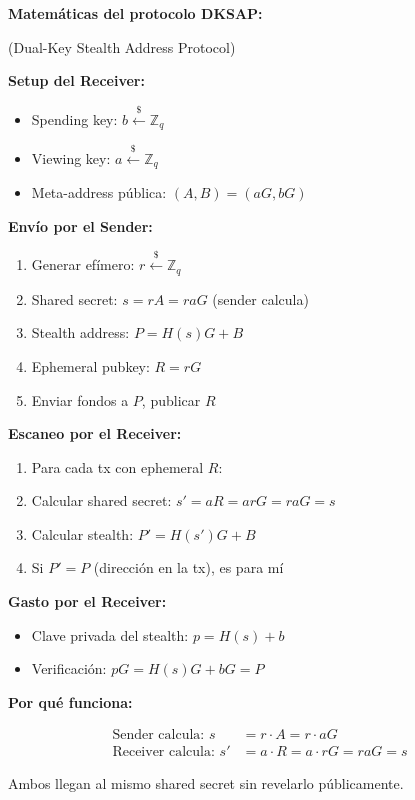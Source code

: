 \documentclass[11pt,a4paper,twoside]{book}
\begin{document}
\begin{mathnote}
\textbf{Matem\'aticas del protocolo DKSAP:}

(Dual-Key Stealth Address Protocol)

\textbf{Setup del Receiver:}
\begin{itemize}
    \item Spending key: $b \xleftarrow{\$} \mathbb{Z}_q$
    \item Viewing key: $a \xleftarrow{\$} \mathbb{Z}_q$
    \item Meta-address p\'ublica: $(A, B) = (aG, bG)$
\end{itemize}

\textbf{Env\'io por el Sender:}
\begin{enumerate}
    \item Generar ef\'imero: $r \xleftarrow{\$} \mathbb{Z}_q$
    \item Shared secret: $s = rA = raG$ (sender calcula)
    \item Stealth address: $P = H(s)G + B$
    \item Ephemeral pubkey: $R = rG$
    \item Enviar fondos a $P$, publicar $R$
\end{enumerate}

\textbf{Escaneo por el Receiver:}
\begin{enumerate}
    \item Para cada tx con ephemeral $R$:
    \item Calcular shared secret: $s' = aR = arG = raG = s$
    \item Calcular stealth: $P' = H(s')G + B$
    \item Si $P' = P$ (direcci\'on en la tx), es para m\'i
\end{enumerate}

\textbf{Gasto por el Receiver:}
\begin{itemize}
    \item Clave privada del stealth: $p = H(s) + b$
    \item Verificaci\'on: $pG = H(s)G + bG = P$ \checkmark
\end{itemize}

\textbf{Por qu\'e funciona:}

\begin{align*}
\text{Sender calcula: } s &= r \cdot A = r \cdot aG \\
\text{Receiver calcula: } s' &= a \cdot R = a \cdot rG = raG = s
\end{align*}

Ambos llegan al mismo shared secret sin revelarlo p\'ublicamente.
\end{mathnote}
\end{document}
